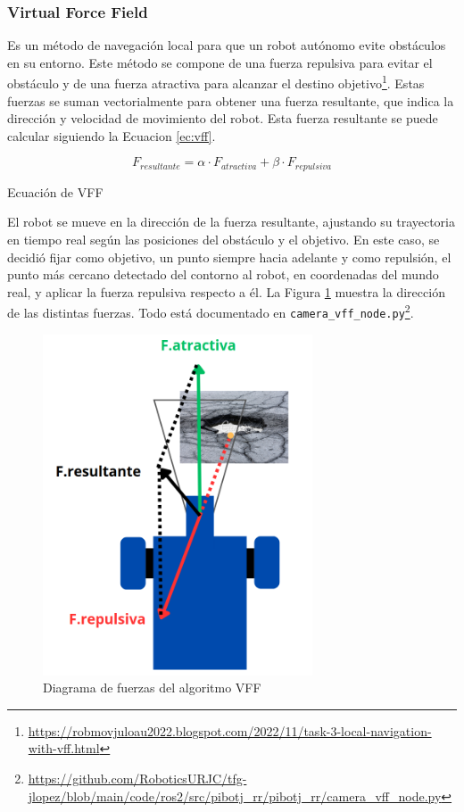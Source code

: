 \subsubsection{Virtual Force Field}
\label{subsubsec:vff}

Es un método de navegación local para que un robot autónomo evite obstáculos en su entorno. Este método se compone de una fuerza repulsiva para evitar el obstáculo y de una fuerza atractiva para alcanzar el destino objetivo\footnote{\url{https://robmovjuloau2022.blogspot.com/2022/11/task-3-local-navigation-with-vff.html}}. Estas fuerzas se suman vectorialmente para obtener una fuerza resultante, que indica la dirección y velocidad de movimiento del robot. Esta fuerza resultante se puede calcular siguiendo la Ecuacion \ref{ec:vff}.

\begin{myequation}[h]
	\begin{equation}
		F_{resultante} = \alpha \cdot F_{atractiva} + \beta \cdot F_{repulsiva}
		\nonumber
	\end{equation}
	\caption[Ecuación de VFF]{Ecuación de VFF}
	\label{ec:vff}
\end{myequation} 

El robot se mueve en la dirección de la fuerza resultante, ajustando su trayectoria en tiempo real según las posiciones del obstáculo y el objetivo. En este caso, se decidió fijar como objetivo, un punto siempre hacia adelante y como repulsión, el punto más cercano detectado del contorno al robot, en coordenadas del mundo real, y aplicar la fuerza repulsiva respecto a él. La Figura \ref{fig:vfffuerzas} muestra la dirección de las distintas fuerzas. Todo está documentado en \verb|camera_vff_node.py|\footnote{\url{https://github.com/RoboticsURJC/tfg-jlopez/blob/main/code/ros2/src/pibotj_rr/pibotj_rr/camera_vff_node.py}}.


 \begin{figure} [h!]
	\begin{center}
		\includegraphics[width=8cm]{figs/cap6/vff.png}
	\end{center}
	\caption{Diagrama de fuerzas del algoritmo VFF}
	\label{fig:vfffuerzas}
\end{figure}

